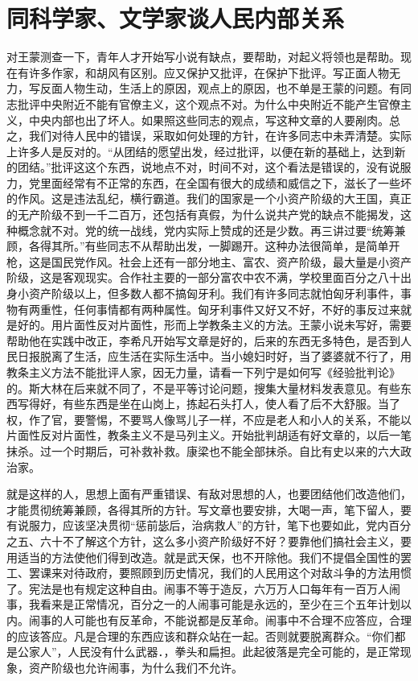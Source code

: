 \section[同科学家、文学家谈人民内部关系（一九五七年三月十六日）]{同科学家、文学家谈人民内部关系}


对王蒙测查一下，青年人才开始写小说有缺点，要帮助，对起义将领也是帮助。现在有许多作家，和胡风有区别。应又保护又批评，在保护下批评。写正面人物无力，写反面人物生动，生活上的原因，观点上的原因，也不单是王蒙的问题。有同志批评中央附近不能有官僚主义，这个观点不对。为什么中央附近不能产生官僚主义，中央内部也出了坏人。如果照这些同志的观点，写这种文章的人要剐肉。总之，我们对待人民中的错误，采取如何处理的方针，在许多同志中未弄清楚。实际上许多人是反对的。“从团结的愿望出发，经过批评，以便在新的基础上，达到新的团结。”批评这这个东西，说地点不对，时间不对，这个看法是错误的，没有说服力，党里面经常有不正常的东西，在全国有很大的成绩和威信之下，滋长了一些坏的作风。这是违法乱纪，横行霸道。我们的国家是一个小资产阶级的大王国，真正的无产阶级不到一千二百万，还包括有真假，为什么说共产党的缺点不能揭发，这种概念就不对。党的统一战线，党内实际上赞成的还是少数。再三讲过要“统筹兼顾，各得其所。”有些同志不从帮助出发，一脚踢开。这种办法很简单，是简单开枪，这是国民党作风。社会上还有一部分地主、富农、资产阶级，最大量是小资产阶级，这是客观现实。合作社主要的一部分富农中农不满，学校里面百分之八十出身小资产阶级以上，但多数人都不搞匈牙利。我们有许多同志就怕匈牙利事件，事物有两重性，任何事情都有两种属性。匈牙利事件又好又不好，不好的事反过来就是好的。用片面性反对片面性，形而上学教条主义的方法。王蒙小说未写好，需要帮助他在实践中改正，李希凡开始写文章是好的，后来的东西无多特色，是否到人民日报脱离了生活，应生活在实际生活中。当小媳妇时好，当了婆婆就不行了，用教条主义方法不能批评人家，因无力量，请看一下列宁是如何写《经验批判论》的。斯大林在后来就不同了，不是平等讨论问题，搜集大量材料发表意见。有些东西写得好，有些东西是坐在山岗上，拣起石头打人，使人看了后不大舒服。当了权，作了官，要警惕，不要骂人像骂儿子一样，不应是老人和小人的关系，不能以片面性反对片面性，教条主义不是马列主义。开始批判胡适有好文章的，以后一笔抹杀。过一个时期后，可补救补救。康梁也不能全部抹杀。自比有史以来的六大政治家。

就是这样的人，思想上面有严重错误、有敌对思想的人，也要团结他们改造他们，才能贯彻统筹兼顾，各得其所的方针。写文章也要安排，大喝一声，笔下留人，要有说服力，应该坚决贯彻“惩前毖后，治病救人”的方针，笔下也要如此，党内百分之五、六十不了解这个方针，这么多小资产阶级好不好？要靠他们搞社会主义，要用适当的方法使他们得到改造。就是武天保，也不开除他。我们不提倡全国性的罢工、罢课来对待政府，要照顾到历史情况，我们的人民用这个对敌斗争的方法用惯了。宪法是也有规定这种自由。闹事不等于造反，六万万人口每年有一百万人闹事，我看来是正常情况，百分之一的人闹事可能是永远的，至少在三个五年计划以内。闹事的人可能也有反革命，不能说都是反革命。闹事中不合理不应答应，合理的应该答应。凡是合理的东西应该和群众站在一起。否则就要脱离群众。“你们都是公家人”，人民没有什么武器．，拳头和扁担。此起彼落是完全可能的，是正常现象，资产阶级也允许闹事，为什么我们不允许。

